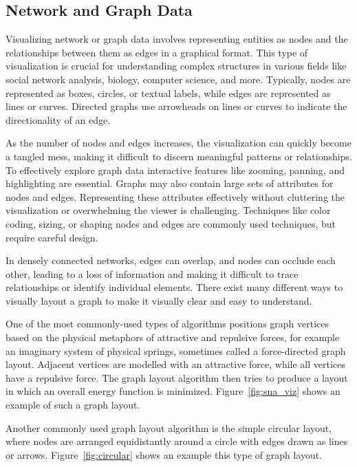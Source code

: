 \subsection*{Network and Graph Data}

Visualizing network or graph data involves representing entities as nodes and the relationships between them as edges in a graphical format. This type of visualization is crucial for understanding complex structures in various fields like social network analysis, biology, computer science, and more. Typically, nodes are represented as boxes, circles, or textual labels, while edges are represented as lines or curves. Directed graphs use arrowheads on lines or curves to indicate the directionality of an edge. 

As the number of nodes and edges increases, the visualization can quickly become a tangled mess, making it difficult to discern meaningful patterns or relationships. To effectively explore graph data interactive features like zooming, panning, and highlighting are essential. Graphs may also contain large sets of attributes for nodes and edges. Representing these attributes effectively without cluttering the visualization or overwhelming the viewer is challenging. Techniques like color coding, sizing, or shaping nodes and edges are commonly used techniques, but require careful design.

In densely connected networks, edges can overlap, and nodes can occlude each other, leading to a loss of information and making it difficult to trace relationships or identify individual elements. There exist many different ways to visually layout a graph to make it visually clear and easy to understand. 

One of the most commonly-used types of algorithms positions graph vertices based on the physical metaphors of attractive and repulsive forces, for example an imaginary system of physical springs, sometimes called a force-directed graph layout. Adjacent vertices are modelled with an attractive force, while all vertices have a repulsive force. The graph layout algorithm then tries to produce a layout in which an overall energy function is minimized. Figure~\ref{fig:sna_viz} shows an example of such a graph layout.

Another commonly used graph layout algorithm is the simple circular layout, where nodes are arranged equidistantly around a circle with edges drawn as lines or arrows. Figure~\ref{fig:circular} shows an example this type of graph layout.

